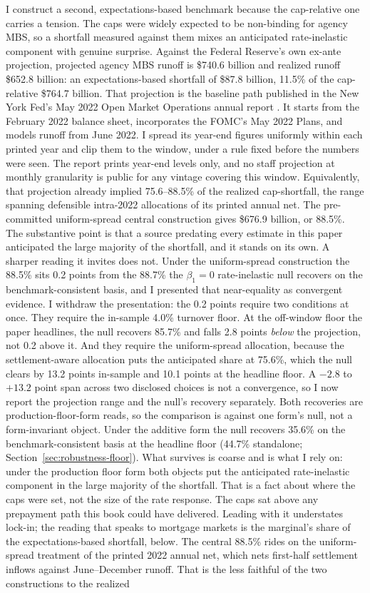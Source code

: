 \documentclass[12pt]{article}
\begin{document}
I construct a second, expectations-based benchmark because the cap-relative one carries a tension. The caps were widely expected to be non-binding for agency MBS, so a shortfall measured against them mixes an anticipated rate-inelastic component with genuine surprise. Against the Federal Reserve's own ex-ante projection, projected agency MBS runoff is \$740.6 billion and realized runoff \$652.8 billion: an expectations-based shortfall of \$87.8 billion, 11.5\% of the cap-relative \$764.7 billion. That projection is the baseline path published in the New York Fed's May 2022 Open Market Operations annual report \citep{omo2021}. It starts from the February 2022 balance sheet, incorporates the FOMC's May 2022 Plans, and models runoff from June 2022. I spread its year-end figures uniformly within each printed year and clip them to the window, under a rule fixed before the numbers were seen. The report prints year-end levels only, and no staff projection at monthly granularity is public for any vintage covering this window. Equivalently, that projection already implied 75.6--88.5\% of the realized cap-shortfall, the range spanning defensible intra-2022 allocations of its printed annual net. The pre-committed uniform-spread central construction gives \$676.9 billion, or 88.5\%. The substantive point is that a source predating every estimate in this paper anticipated the large majority of the shortfall, and it stands on its own. A sharper reading it invites does not. Under the uniform-spread construction the 88.5\% sits 0.2 points from the 88.7\% the $\beta_1 = 0$ rate-inelastic null recovers on the benchmark-consistent basis, and I presented that near-equality as convergent evidence. I withdraw the presentation: the 0.2 points require two conditions at once. They require the in-sample 4.0\% turnover floor. At the off-window floor the paper headlines, the null recovers 85.7\% and falls 2.8 points \emph{below} the projection, not 0.2 above it. And they require the uniform-spread allocation, because the settlement-aware allocation puts the anticipated share at 75.6\%, which the null clears by 13.2 points in-sample and 10.1 points at the headline floor. A $-2.8$ to $+13.2$ point span across two disclosed choices is not a convergence, so I now report the projection range and the null's recovery separately. Both recoveries are production-floor-form reads, so the comparison is against one form's null, not a form-invariant object. Under the additive form the null recovers 35.6\% on the benchmark-consistent basis at the headline floor (44.7\% standalone; Section~\ref{sec:robustness-floor}). What survives is coarse and is what I rely on: under the production floor form both objects put the anticipated rate-inelastic component in the large majority of the shortfall. That is a fact about where the caps were set, not the size of the rate response. The caps sat above any prepayment path this book could have delivered. Leading with it understates lock-in; the reading that speaks to mortgage markets is the marginal's share of the expectations-based shortfall, below. The central 88.5\% rides on the uniform-spread treatment of the printed 2022 annual net, which nets first-half settlement inflows against June--December runoff. That is the less faithful of the two constructions to the realized 
\end{document}
